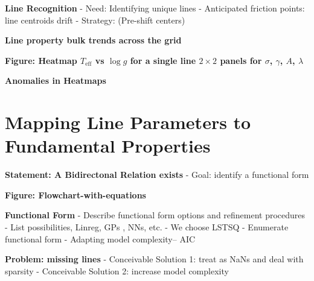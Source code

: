 \documentclass[twocolumn]{aastex631}
\begin{document}
\begin{mdframed}
    \textbf{Line Recognition}
    - Need: Identifying unique lines
    - Anticipated friction points: line centroids drift
    - Strategy: (Pre-shift centers)
    \textcolor{lightgray}{\blindtext}
\end{mdframed}

\begin{mdframed}
    \textbf{Line property bulk trends across the grid}
    \textcolor{lightgray}{\blindtext}
\end{mdframed}

\begin{mdframed}
    \textbf{Figure: Heatmap $T_\mathrm{eff}$ vs $\log{g}$ for a single line $2\times2$ panels for $\sigma$, $\gamma$, $A$, $\lambda$ }
\end{mdframed}

\begin{mdframed}
    \textbf{Anomalies in Heatmaps}
    \textcolor{lightgray}{\blindtext}
\end{mdframed}

\section{Mapping Line Parameters to Fundamental Properties}
\begin{mdframed}
    \textbf{Statement: A Bidirectonal Relation exists}
    - Goal: identify a functional form
    \textcolor{lightgray}{\blindtext}
\end{mdframed}

\begin{mdframed}
    \textbf{Figure: Flowchart-with-equations}
\end{mdframed}

\begin{mdframed}
    \textbf{Functional Form}
    - Describe functional form options and refinement procedures
    - List possibilities, Linreg, GPs \citep{2023ARA&A..61..329A}, NNs, etc.
    - We choose LSTSQ
    - Enumerate functional form
    - Adapting model complexity-- AIC
    \textcolor{lightgray}{\blindtext}
\end{mdframed}

\begin{mdframed}
    \textbf{Problem: missing lines}
    - Conceivable Solution 1: treat as NaNs and deal with sparsity
    - Conceivable Solution 2: increase model complexity
    \textcolor{lightgray}{\blindtext}
\end{mdframed}
\end{document}
